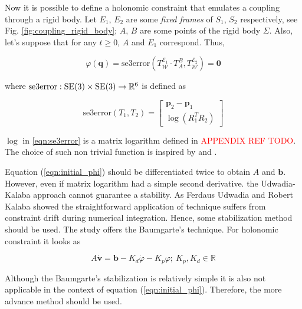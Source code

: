 Now it is possible to define a holonomic constraint that emulates a coupling 
through a rigid body. Let $E_1$, $E_2$ are some \emph{fixed frames} of 
$S_1$, $S_2$ respectively, see Fig. \ref{fig:coupling_rigid_body}; $A$, $B$ are 
some points of the rigid body $\Sigma$. Also, let's suppose that for any $t \geq 0$, 
$A$ and $E_1$ correspond. Thus, 

\begin{equation}
    \varphi(\mathbf{q}) = \text{se3error}(
        T_{\mathcal{W}}^{\mathcal{E}_1} \cdot
        T_{A}^{B},
        T_{\mathcal{W}}^{\mathcal{E}_2}
    ) = \mathbf{0}
    \label{eqn:initial_phi}
\end{equation}

where $\text{se3error}: \text{SE}(3) \times \text{SE}(3) \rightarrow \mathbb{R}^6$ is defined as

\begin{equation}
    \text{se3error}(T_1, T_2) = 
    \begin{bmatrix}
        \mathbf{p}_2 - \mathbf{p}_1 \\
        \log (R_1^T R_2)
    \end{bmatrix}
    \label{eqn:se3error}
\end{equation}

$\log$ in \ref{eqn:se3error} is a matrix logarithm defined in 
\textcolor{red}{APPENDIX REF TODO}. The choice of such non trivial function is 
inspired by \cite{OutFeedbackStabForOrbRob} and \cite{ANonlinearObserverUsingPose}. 

Equation (\ref{eqn:initial_phi}) should be differentiated twice to obtain $A$ and 
$\mathbf{b}$. However, even if matrix logarithm had a simple second derivative. 
the Udwadia-Kalaba approach cannot guarantee a stability. As Ferdaus Udwadia and 
Robert Kalaba showed \cite{udwadia1996analytical} the straightforward application 
of technique suffers from constraint drift during numerical integration. Hence, 
some stabilization method should be used. The study \cite{udwadia1996analytical} 
offers the Baumgarte's technique. For holonomic constraint it looks as

\begin{equation}
    A \dot{\mathbf{v}} = \mathbf{b} - K_d \dot{\varphi} - K_p \varphi; \:
    K_p, K_d \in \mathbb{R}
    \label{eqn:baumgrate_stab}
\end{equation}

Although the Baumgarte's stabilization is relatively simple it is also not applicable 
in the context of equation (\ref{eqn:initial_phi}). Therefore, the more advance 
method should be used. 

